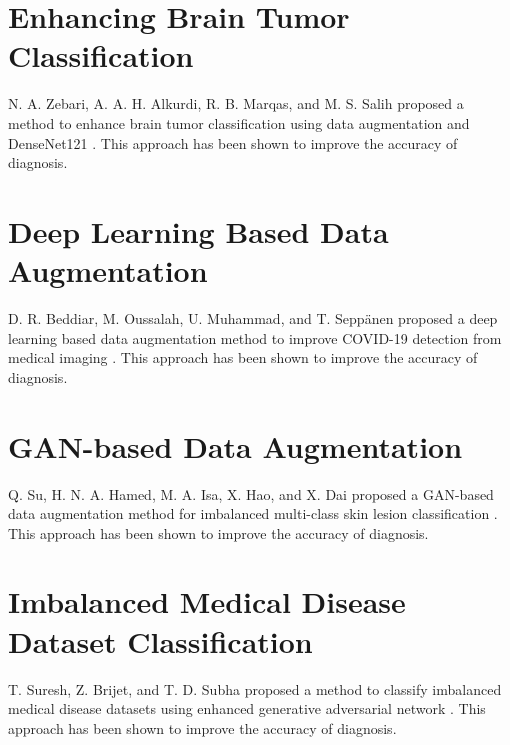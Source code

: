 \documentclass[final,5p,times,twocolumn,authoryear]{elsarticle}
\begin{document}
\section{Enhancing Brain Tumor Classification}
N. A. Zebari, A. A. H. Alkurdi, R. B. Marqas, and M. S. Salih proposed a method to enhance brain tumor classification using data augmentation and DenseNet121 \cite{ref6}. This approach has been shown to improve the accuracy of diagnosis.
\section{Deep Learning Based Data Augmentation}
D. R. Beddiar, M. Oussalah, U. Muhammad, and T. Seppänen proposed a deep learning based data augmentation method to improve COVID-19 detection from medical imaging \cite{ref7}. This approach has been shown to improve the accuracy of diagnosis.
\section{GAN-based Data Augmentation}
Q. Su, H. N. A. Hamed, M. A. Isa, X. Hao, and X. Dai proposed a GAN-based data augmentation method for imbalanced multi-class skin lesion classification \cite{ref8}. This approach has been shown to improve the accuracy of diagnosis.
\section{Imbalanced Medical Disease Dataset Classification}
T. Suresh, Z. Brijet, and T. D. Subha proposed a method to classify imbalanced medical disease datasets using enhanced generative adversarial network \cite{ref9}. This approach has been shown to improve the accuracy of diagnosis.
\end{document}
